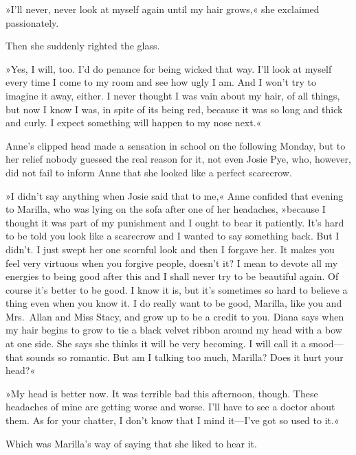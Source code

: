 »I'll never, never look at myself again until my hair grows,« she exclaimed passionately.

Then she suddenly righted the glass.

»Yes, I will, too. I'd do penance for being wicked that way. I'll look at myself every time I come to my room and see how ugly I am. And I won't try to imagine it away, either. I never thought I was vain about my hair, of all things, but now I know I was, in spite of its being red, because it was so long and thick and curly. I expect something will happen to my nose next.«

Anne's clipped head made a sensation in school on the following Monday, but to her relief nobody guessed the real reason for it, not even Josie Pye, who, however, did not fail to inform Anne that she looked like a perfect scarecrow.

»I didn't say anything when Josie said that to me,« Anne confided that evening to Marilla, who was lying on the sofa after one of her headaches, »because I thought it was part of my punishment and I ought to bear it patiently. It's hard to be told you look like a scarecrow and I wanted to say something back. But I didn't. I just swept her one scornful look and then I forgave her. It makes you feel very virtuous when you forgive people, doesn't it? I mean to devote all my energies to being good after this and I shall never try to be beautiful again. Of course it's better to be good. I know it is, but it's sometimes so hard to believe a thing even when you know it. I do really want to be good, Marilla, like you and Mrs.~Allan and Miss Stacy, and grow up to be a credit to you. Diana says when my hair begins to grow to tie a black velvet ribbon around my head with a bow at one side. She says she thinks it will be very becoming. I will call it a snood—that sounds so romantic. But am I talking too much, Marilla? Does it hurt your head?«

»My head is better now. It was terrible bad this afternoon, though. These headaches of mine are getting worse and worse. I'll have to see a doctor about them. As for your chatter, I don't know that I mind it—I've got so used to it.«

Which was Marilla's way of saying that she liked to hear it.

